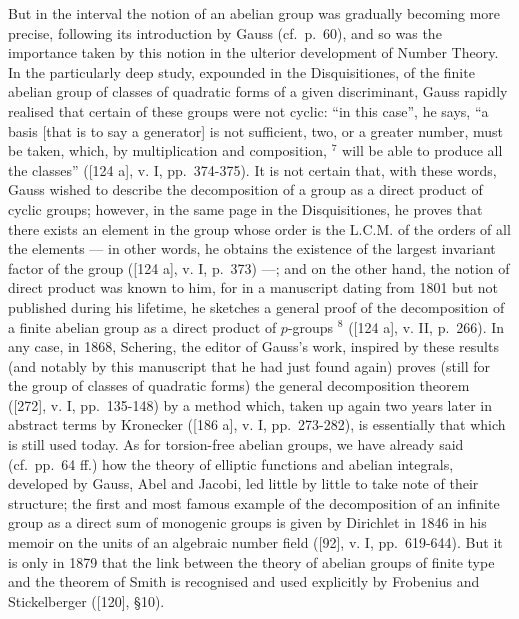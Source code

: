 But in the interval the notion of an abelian group was gradually becoming more precise, following its introduction by Gauss (cf.~p.~60), and so was the importance taken by this notion in the ulterior development of Number Theory. In the particularly deep study, expounded in the Disquisitiones, of the finite abelian group of classes of quadratic forms of a given discriminant, Gauss rapidly realised that certain of these groups were not cyclic: ``in this case'', he says, ``a basis {[}that is to say a generator{]} is not sufficient, two, or a greater number, must be taken, which, by multiplication and composition, \(^{7}\) will be able to produce all the classes'' ({[}124 a{]}, v. I, pp.~374-375). It is not certain that, with these words, Gauss wished to describe the decomposition of a group as a direct product of cyclic groups; however, in the same page in the Disquisitiones, he proves that there exists an element in the group whose order is the L.C.M. of the orders of all the elements --- in other words, he obtains the existence of the largest invariant factor of the group ({[}124 a{]}, v. I, p.~373) ---; and on the other hand, the notion of direct product was known to him, for in a manuscript dating from 1801 but not published during his lifetime, he sketches a general proof of the decomposition of a finite abelian group as a direct product of \(p\)-groups \(^{8}\) ({[}124 a{]}, v. II, p.~266). In any case, in 1868, Schering, the editor of Gauss's work, inspired by these results (and notably by this manuscript that he had just found again) proves (still for the group of classes of quadratic forms) the general decomposition theorem ({[}272{]}, v. I, pp.~135-148) by a method which, taken up again two years later in abstract terms by Kronecker ({[}186 a{]}, v. I, pp.~273-282), is essentially that which is still used today. As for torsion-free abelian groups, we have already said (cf.~pp.~64 ff.) how the theory of elliptic functions and abelian integrals, developed by Gauss, Abel and Jacobi, led little by little to take note of their structure; the first and most famous example of the decomposition of an infinite group as a direct sum of monogenic groups is given by Dirichlet in 1846 in his memoir on the units of an algebraic number field ({[}92{]}, v. I, pp.~619-644). But it is only in 1879 that the link between the theory of abelian groups of finite type and the theorem of Smith is recognised and used explicitly by Frobenius and Stickelberger ({[}120{]}, §10).

